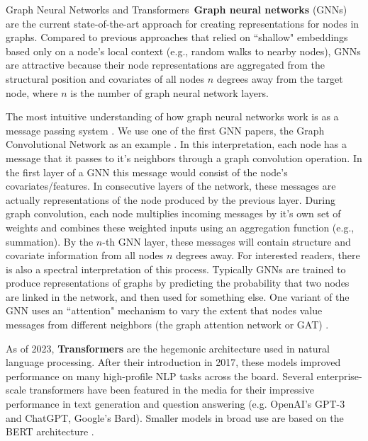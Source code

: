  \begin{TCBBox}[label=Box:gnn]{Graph Neural Networks and Transformers}\
 \textbf{Graph neural networks} (GNNs) are the current state-of-the-art approach for creating representations for nodes in graphs. Compared to previous approaches that relied on ``shallow" embeddings based only on a node's local context (e.g., random walks to nearby nodes), GNNs are attractive because their node representations are aggregated from the structural position and covariates of all nodes $n$ degrees away from the target node, where $n$ is the number of graph neural network layers.


The most intuitive understanding of how graph neural networks work is as a message passing system \citep{gilmer2017neural}. We use one of the first GNN papers, the Graph Convolutional Network as an example \citep{kipf2016semi}. In this interpretation, each node has a message that it passes to it's neighbors through a graph convolution operation. In the first layer of a GNN this message would consist of the node's covariates/features. In consecutive layers of the network, these messages are actually representations of the node produced by the previous layer. During graph convolution, each node multiplies incoming messages by it's own set of weights and combines these weighted inputs using an aggregation function (e.g., summation). By the $n$-th GNN layer, these messages will contain structure and covariate information from all nodes $n$ degrees away. For interested readers, there is also a spectral interpretation of this process. Typically GNNs are trained to produce representations of graphs by predicting the probability that two nodes are linked in the network, and then used for something else. One variant of the GNN uses an ``attention" mechanism to vary the extent that nodes value messages from different neighbors (the graph attention network or GAT) \citep{velivckovic2017graph}. 

As of 2023, \textbf{Transformers} are the hegemonic architecture used in natural language processing. After their introduction in 2017, these models improved performance on many high-profile NLP tasks across the board. Several enterprise-scale transformers have been featured in the media for their impressive performance in text generation and question answering (e.g. OpenAI's GPT-3 and ChatGPT, Google's Bard). Smaller models in broad use are based on the BERT architecture \citep{devlin2018bert}.


\end{TCBBox}
